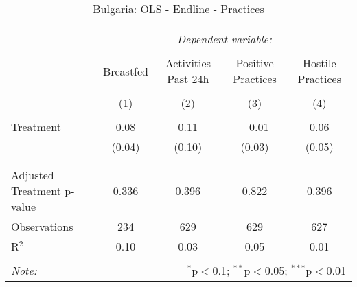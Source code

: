 
\begin{table}[!htbp] \centering 
  \caption{Bulgaria: OLS - Endline - Practices} 
  \label{tbl:Bulgaria: OLS - Endline - Practices} 
\begin{tabular}{@{\extracolsep{5pt}}lcccc} 
\\[-1.8ex]\hline 
\hline \\[-1.8ex] 
 & \multicolumn{4}{c}{\textit{Dependent variable:}} \\ 
\cline{2-5} 
\\[-1.8ex] & Breastfed & Activities Past 24h & Positive Practices & Hostile Practices \\ 
\\[-1.8ex] & (1) & (2) & (3) & (4)\\ 
\hline \\[-1.8ex] 
 Treatment & 0.08 & 0.11 & $-$0.01 & 0.06 \\ 
  & (0.04) & (0.10) & (0.03) & (0.05) \\ 
  & & & & \\ 
\hline \\[-1.8ex] 
Adjusted Treatment p-value & 0.336 & 0.396 & 0.822 & 0.396 \\ 
Observations & 234 & 629 & 629 & 627 \\ 
R$^{2}$ & 0.10 & 0.03 & 0.05 & 0.01 \\ 
\hline 
\hline \\[-1.8ex] 
\textit{Note:}  & \multicolumn{4}{r}{$^{*}$p$<$0.1; $^{**}$p$<$0.05; $^{***}$p$<$0.01} \\ 
\end{tabular} 
\end{table} 
